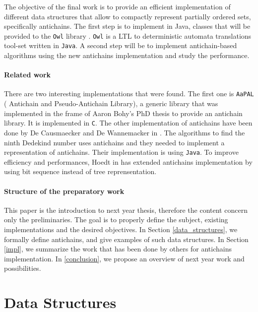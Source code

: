 \documentclass[letterpaper]{article}
\theoremstyle{definition}
\begin{document}
The objective of the final work
is to provide an efficient implementation of different
data structures that allow to compactly
represent partially ordered sets, specifically antichains.
The first step is to implement in Java, classes that will be provided to
the \texttt{Owl} library \cite{owl}.
\texttt{Owl} is a LTL to deterministic automata translations tool-set written
in \texttt{Java}. A second step will be to implement
antichain-based algorithms using the new antichains implementation and
study the performance.

\paragraph{Related work}

There are two interesting implementations that were found.
The first one is \texttt{AaPAL} (
Antichain and Pseudo-Antichain Library), a generic
library that was implemented in the frame of
Aaron Bohy's PhD thesis \cite{bohy_phd}
to provide an antichain library. It is implemented in \texttt{C}.
The other implementation of antichains
have been done
by De Causmaecker and De Wannemacker in \cite{causemaecker1}. The algorithms
to find the ninth Dedekind number uses antichains and they needed to
implement a representation of antichains. Their implementation is using
\texttt{Java}.
To improve efficiency and performances, Hoedt in \cite{hoedt} has extended
\cite{causemaecker1} antichains implementation by using bit sequence
instead of tree reprensentation.

\paragraph{Structure of the preparatory work}

This paper is the introduction to next year thesis, therefore
the content concern only the preliminaries. The goal is to
properly define the subject,
existing implementations and the desired objectives.
In Section \ref{data_structures}, we formally define antichains,
and give examples of such data structures. In Section \ref{impl},
we summarize the work that has been done by others
for antichains implementation. In \ref{conclusion}, we propose
an overview of next year work and possibilities.

\newpage

\section{Data Structures}
\end{document}
